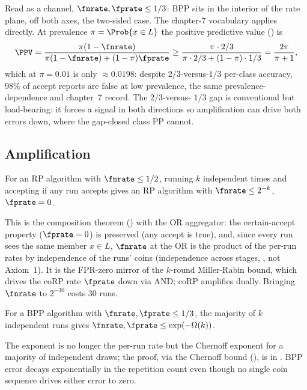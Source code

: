 Read as a channel, $\fnrate, \fprate \le 1/3$: BPP sits in the interior of the
rate plane, off both axes, the two-sided case. The chapter-7 vocabulary applies directly. At
prevalence $\pi = \Prob{x \in L}$ the positive predictive
value () is
\[
  \PPV = \frac{\pi(1 - \fnrate)}{\pi(1 - \fnrate) + (1 - \pi)\fprate}
       \ge \frac{\pi \cdot 2/3}{\pi \cdot 2/3 + (1 - \pi)\cdot 1/3}
       = \frac{2\pi}{\pi + 1},
\]
which at $\pi = 0.01$ is only $\approx 0.0198$: despite $2/3$-versus-$1/3$
per-class accuracy, $98\%$ of accept reports are false at low
prevalence, the
same prevalence-dependence  and chapter~7 record. The $2/3$-versus-
$1/3$ gap is conventional but load-bearing: it forces a signal in both
directions so amplification can drive both errors down, where the gap-closed
class PP cannot.

\subsection*{Amplification}

\begin{theorem}[RP amplification]
\label{thm:rp-amplification}
For an RP algorithm with $\fnrate \le 1/2$, running $k$ independent times and
accepting if any run accepts gives an RP algorithm with $\fnrate \le 2^{-k}$,
$\fprate = 0$.
\end{theorem}

This is the composition theorem () with the OR
aggregator: the certain-accept property ($\fprate =
0$) is preserved (any accept is true), and, since every run sees the same
member $x \in L$, $\fnrate$ at the OR is the product of the per-run rates by
independence of the runs' coins (independence across stages,
, not Axiom~1). It is the FPR-zero mirror of the $k$-round
Miller-Rabin bound, which drives the coRP rate $\fprate$ down via AND; coRP
amplifies dually. Bringing $\fnrate$ to $2^{-30}$ costs $30$ runs.

\begin{theorem}
\label{thm:bpp-amplification}
For a BPP algorithm with $\fnrate, \fprate \le 1/3$, the majority of $k$
independent runs gives $\fnrate, \fprate \le \exp(-\Omega(k))$.
\end{theorem}

The exponent is no longer the per-run rate but the Chernoff exponent for a
majority of independent draws; the proof, via the Chernoff bound
(), is in . BPP error decays
exponentially in the repetition count even though no single coin sequence drives
either error to zero.

